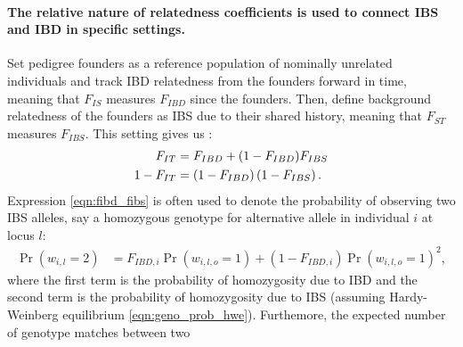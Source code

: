 \paragraph{The relative nature of relatedness coefficients is used to
connect IBS and IBD in specific settings.}
% 
Set pedigree founders as a reference population of nominally unrelated
individuals and track IBD relatedness from the founders forward in time,
meaning that $F_{IS}$ measures $F_{IBD}$ since the founders.
%
Then, define background relatedness of the founders as IBS due to their
shared history, meaning that $F_{ST}$ measures $F_{IBS}$.
%
This setting gives us
\citep[e.g.,][]{jacquard1975inbreeding, powell2010reconciling,
legarra2015ancestral, legarra2016comparing}:
%
\begin{align} \label{eqn:fibd_fibs}
      F_{IT} & = F_{IBD} + (1 - F_{IBD}) F_{IBS}\\
  1 - F_{IT} & = \left(1 - F_{IBD}\right)\left(1 - F_{IBS}\right). \notag
\end{align}
%
Expression \eqref{eqn:fibd_fibs} is often used to denote the probability
of observing two IBS alleles, say a homozygous genotype for alternative
allele in individual $i$ at locus $l$:
%
\begin{align} \label{eqn:fibd_fibs_genotype}
  \Pr\left(w_{i,l} = 2\right) & = F_{IBD,i} \Pr\left(w_{i,l,o} = 1\right) +
                                  (1 - F_{IBD,i}) \Pr\left(w_{i,l,o} = 1\right)^2,
\end{align}
%
where the first term is the probability of homozygosity due to IBD and the
second term is the probability of homozygosity due to IBS (assuming
Hardy-Weinberg equilibrium \eqref{eqn:geno_prob_hwe}).
%
Furthemore, the expected number of genotype matches between two 
%

